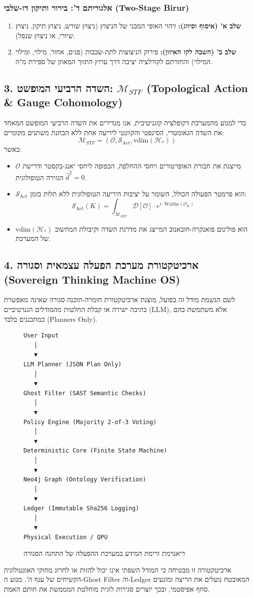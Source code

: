\documentclass{article}
\begin{document}
\subsubsection{אלגוריתם ד': בירור ותיקון דו-שלבי (Two-Stage Birur)}
\begin{enumerate}
    \item \textbf{שלב א' (איסוף וסיווג):} זיהוי האופי המבני של הניצוץ (ניצוץ שורש, ניצוץ תיקון, ניצוץ שיורי, או ניצוץ שנפל).
    \item \textbf{שלב ב' (השבה לקו האיזון):} פירוק הניצוצות לתת-שכבות (פנים, אחור, מילוי, ומילוי המילוי) והחזרתם לקורלציה יציבה דרך ערוץ התווך המאוזן של ספירת מ"ה.
\end{enumerate}

\subsection{3. השדה הרביעי המופשט: $\mathcal{M}_{STF}$ (Topological Action \& Gauge Cohomology)}
כדי למנוע מהמערכת דקופלציה קוגניטיבית, אנו מגדירים את השדה הרביעי המופשט המאחד את השדה הגאומטרי, הסינפטי והקוונטי ליריעה אחת ללא הבחנת משתנים מקומיים:
\[ \mathcal{M}_{STF} = \left( \mathcal{O}, \mathcal{S}_{\text{Act}}, \text{vdim}(\mathcal{H}_*) \right) \]
כאשר:
\begin{itemize}
    \item $\mathcal{O}$ מייצגת את חבורת האופרטורים ויחסי ההחלפה, הכפופה ליחסי יאנג-בקסטר ודרישת הגזירה הטופולוגית $\widehat{d}^2 = 0$.
    \item $\mathcal{S}_{\text{Act}}$ הוא פרמטר הפעולה הכולל, השומר על יציבות היריעה הטופולוגית ללא תלות בזמן:
    \[ \mathcal{S}_{\text{Act}}(K) = \int_{\mathcal{M}_{STF}} \mathcal{D}[\mathcal{O}] \cdot e^{i \cdot \text{Writhe}(\mathcal{O}_K)} \]
    \item $\text{vdim}(\mathcal{H}_*)$ הוא פולינום פואנקרה-חובאנוב המייצג את מדרגת השדה וקיבולת המחשוב של המערכת.
\end{itemize}

\subsection{4. ארכיטקטורת מערכת הפעלה עצמאית וסגורה (Sovereign Thinking Machine OS)}
לשם הגשמת מודל זה בפועל, מוצגת ארכיטקטורת חומרה-תוכנה סגורה שאינה מאפשרת כתיבה ישירה או קבלת החלטות מהמודלים הגנרטיביים (LLM), אלא משתמשת בהם כמתכננים בלבד (Planners Only).

\begin{figure}[h]
\centering
\begin{verbatim}
User Input
   │
   ▼
LLM Planner (JSON Plan Only)
   │
   ▼
Ghost Filter (SAST Semantic Checks)
   │
   ▼
Policy Engine (Majority 2-of-3 Voting)
   │
   ▼
Deterministic Core (Finite State Machine)
   │
   ▼
Neo4j Graph (Ontology Verification)
   │
   ▼
Ledger (Immutable Sha256 Logging)
   │
   ▼
Physical Execution / QPU
\end{verbatim}
\caption{דיאגרמת זרימת המידע במערכת ההפעלה של התחנה הסגורה}
\end{figure}

ארכיטקטורה זו מבטיחה כי המודל השפתי אינו יכול להזות או לחרוג מחוקי האונטולוגיה הקשיחים של ענף ה'. מנוע ה-Ghost Filter וה-Ledger המאובטח נועלים את הריצה ומונעים סחף אפיסטמי, ובכך יוצרים סגירות לוגית מוחלטת המממשת את חותם האמת.
\end{document}
